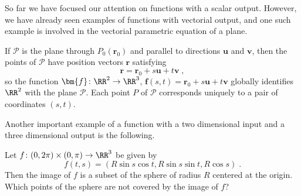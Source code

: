 
So far we have focused our attention on functions with
a scalar output. However, we have already seen examples of
functions with vectorial output, and one such example is
involved in the vectorial parametric equation of a plane.

If $\mathcal{P}$ is the plane through
$P_0(\textbf{r}_0)$ and parallel to directions
$\textbf{u}$ and $\textbf{v}$, then the points
of $\mathcal{P}$ have position vectors $\textbf{r}$
satisfying
%
$$\textbf{r} = \textbf{r}_0 + s \textbf{u} +
t \textbf{v}\; ,$$
%
so the function $\bm{f} \colon \RR^2 \to \RR^3$,
$\bm{f}(s,t) = \textbf{r}_0 +
s \textbf{u} + t \textbf{v}$ globally identifies
$\RR^2$ with the plane $\mathcal{P}$.
Each point $P$ of $\mathcal{P}$ corresponds
uniquely to a pair of coordinates $(s,t)$.

Another important example of a function with a
two dimensional input and a three dimensional output is
the following.

\begin{example}{\rm Let $f \colon (0,2\pi)
\times (0,\pi) \to \RR^3$ be given by
%
$$f(t,s) = (R\sin{s}\cos{t}, R\sin{s}\sin{t},
R\cos{s}) \; .$$
%
Then the image of $f$ is a subset of the
sphere of radius $R$ centered at the origin.
Which points of the sphere are not covered
by the image of $f$?
}\end{example}